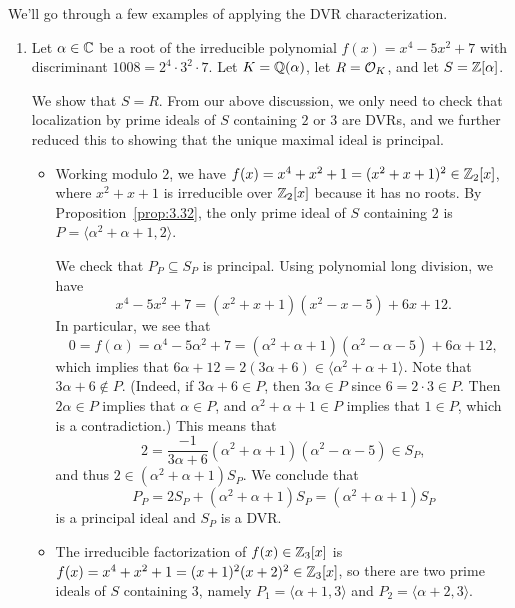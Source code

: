 We'll go through a few examples of applying the DVR characterization. 
\begin{enumerate}[(1)]
    \item Let $\alpha \in \mathbb{C}$ be a root of the irreducible polynomial 
    $f(x) = x^4 - 5x^2 + 7$ with discriminant $1008 = 2^4 \cdot 3^2 \cdot 7$. 
    Let $K = \mathbb{Q}(\alpha)$, let $R = {\cal O}_K$, and let $S = \mathbb{Z}[\alpha]$. 

    We show that $S = R$. From our above discussion, we only need to 
    check that localization by prime ideals of $S$ containing $2$ or $3$ 
    are DVRs, and we further reduced this to showing that the unique 
    maximal ideal is principal. 

    \begin{itemize} 

        \item Working modulo $2$, we have $f(x) = x^4 + x^2 + 1 = (x^2 + x + 1)^2 
        \in \mathbb{Z}_2[x]$, where $x^2 + x + 1$ is irreducible over $\mathbb{Z}_2[x]$ because 
        it has no roots. By Proposition~\ref{prop:3.32}, the only prime ideal of $S$ 
        containing $2$ is $P = \langle \alpha^2 + \alpha + 1, 2 \rangle$.

        We check that $P_P \subseteq S_P$ is principal. Using
        polynomial long division, we have 
        \[ x^4 - 5x^2 + 7 = (x^2 + x + 1)(x^2 - x - 5) + 6x + 12. \] 
        In particular, we see that 
        \[ 0 = f(\alpha) = \alpha^4 - 5\alpha^2 + 7 = (\alpha^2 + \alpha + 1)
        (\alpha^2 - \alpha - 5) + 6\alpha + 12, \] 
        which implies that $6\alpha + 12 = 2(3\alpha + 6) \in \langle \alpha^2 + 
        \alpha + 1 \rangle$. Note that $3\alpha + 6 \notin P$. (Indeed, 
        if $3\alpha + 6 \in P$, then $3\alpha \in P$ since $6 = 2 \cdot 3 \in P$.
        Then $2\alpha \in P$ implies that $\alpha \in P$, and $\alpha^2 + \alpha + 1 \in P$ 
        implies that $1 \in P$, which is a contradiction.) This means that 
        \[ 2 = \frac{-1}{3\alpha + 6} (\alpha^2 + \alpha + 1)(\alpha^2 - \alpha - 5) \in S_P, \] 
        and thus $2 \in (\alpha^2 + \alpha + 1)S_P$. We conclude that 
        \[ P_P = 2S_P + (\alpha^2 + \alpha + 1)S_P = (\alpha^2 + \alpha + 1)S_P \] 
        is a principal ideal and $S_P$ is a DVR.  

        \item The irreducible factorization of $f(x) \in \mathbb{Z}_3[x]$ is 
        $f(x) = x^4 + x^2 + 1 = (x+1)^2 (x+2)^2 \in \mathbb{Z}_3[x]$, so 
        there are two prime ideals of $S$ containing $3$, namely 
        $P_1 = \langle \alpha + 1, 3 \rangle$ and $P_2 = \langle \alpha + 2, 3 \rangle$. 


\end{itemize}
\end{enumerate}
